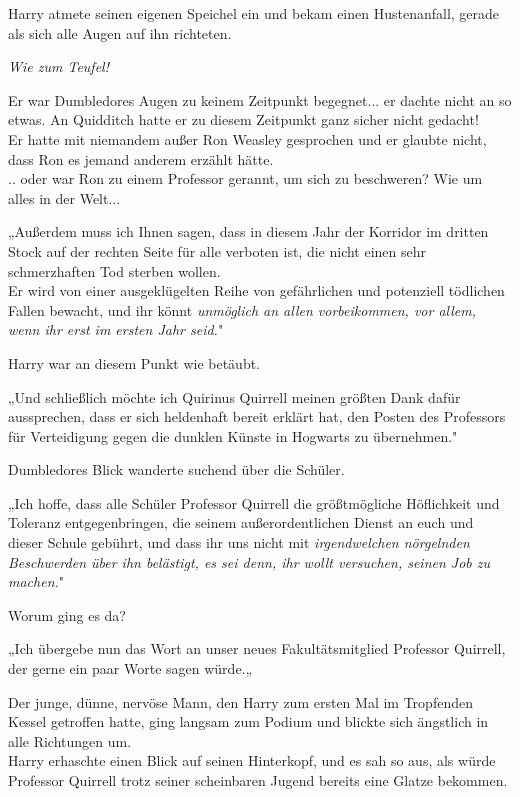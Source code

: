 {Harry atmete seinen eigenen Speichel ein und bekam einen Hustenanfall, gerade als sich alle Augen auf ihn richteten.

\emph{Wie zum Teufel!}

Er war Dumbledores Augen zu keinem Zeitpunkt begegnet... er dachte nicht an so etwas. An Quidditch hatte er zu diesem Zeitpunkt ganz sicher nicht gedacht!\\ Er hatte mit niemandem außer Ron Weasley gesprochen und er glaubte nicht, dass Ron es jemand anderem erzählt hätte.\\ .. oder war Ron zu einem Professor gerannt, um sich zu beschweren? Wie um alles in der Welt...

„Außerdem muss ich Ihnen sagen, dass in diesem Jahr der Korridor im dritten Stock auf der rechten Seite für alle verboten ist, die nicht einen sehr schmerzhaften Tod sterben wollen.\\ Er wird von einer ausgeklügelten Reihe von gefährlichen und potenziell tödlichen Fallen bewacht, und ihr könnt \emph{unmöglich an allen vorbeikommen, vor allem, wenn ihr erst im ersten Jahr seid.}"

Harry war an diesem Punkt wie betäubt.

„Und schließlich möchte ich Quirinus Quirrell meinen größten Dank dafür aussprechen, dass er sich heldenhaft bereit erklärt hat, den Posten des Professors für Verteidigung gegen die dunklen Künste in Hogwarts zu übernehmen."

Dumbledores Blick wanderte suchend über die Schüler.

„Ich hoffe, dass alle Schüler Professor Quirrell die größtmögliche Höflichkeit und Toleranz entgegenbringen, die seinem außerordentlichen Dienst an euch und dieser Schule gebührt, und dass ihr uns nicht mit \emph{irgendwelchen nörgelnden Beschwerden über ihn belästigt, es sei denn, ihr wollt versuchen, seinen Job zu machen.}"

Worum ging es da?

„Ich übergebe nun das Wort an unser neues Fakultätsmitglied Professor Quirrell, der gerne ein paar Worte sagen würde.„

Der junge, dünne, nervöse Mann, den Harry zum ersten Mal im Tropfenden Kessel getroffen hatte, ging langsam zum Podium und blickte sich ängstlich in alle Richtungen um.\\ Harry erhaschte einen Blick auf seinen Hinterkopf, und es sah so aus, als würde Professor Quirrell trotz seiner scheinbaren Jugend bereits eine Glatze bekommen.

}
